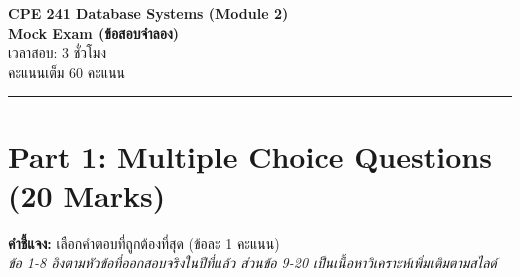\documentclass[a4paper,12pt]{article}
\begin{document}
\begin{center}
    \textbf{\Large CPE 241 Database Systems (Module 2)}\\
    \textbf{Mock Exam (ข้อสอบจำลอง)}\\
    \vspace{0.2cm}
    เวลาสอบ: 3 ชั่วโมง\\
    คะแนนเต็ม 60 คะแนน
\end{center}
\hrule
\vspace{0.5cm}

\section*{Part 1: Multiple Choice Questions (20 Marks)}
\textbf{คำชี้แจง:} เลือกคำตอบที่ถูกต้องที่สุด (ข้อละ 1 คะแนน)\\
\textit{ข้อ 1-8 อิงตามหัวข้อที่ออกสอบจริงในปีที่แล้ว ส่วนข้อ 9-20 เป็นเนื้อหาวิเคราะห์เพิ่มเติมตามสไลด์}
\end{document}
